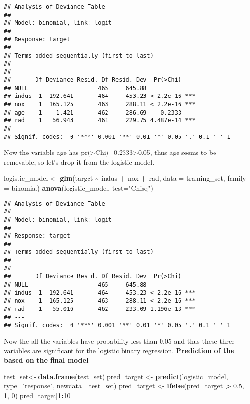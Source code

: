 \documentclass[
]{article}
\newenvironment{Shaded}{\begin{snugshade}}{\end{snugshade}}
\newcommand{\AttributeTok}[1]{\textcolor[rgb]{0.13,0.29,0.53}{#1}}
\newcommand{\DecValTok}[1]{\textcolor[rgb]{0.00,0.00,0.81}{#1}}
\newcommand{\FloatTok}[1]{\textcolor[rgb]{0.00,0.00,0.81}{#1}}
\newcommand{\FunctionTok}[1]{\textcolor[rgb]{0.13,0.29,0.53}{\textbf{#1}}}
\newcommand{\NormalTok}[1]{#1}
\newcommand{\OtherTok}[1]{\textcolor[rgb]{0.56,0.35,0.01}{#1}}
\newcommand{\SpecialCharTok}[1]{\textcolor[rgb]{0.81,0.36,0.00}{\textbf{#1}}}
\newcommand{\StringTok}[1]{\textcolor[rgb]{0.31,0.60,0.02}{#1}}
\begin{document}
\begin{verbatim}
## Analysis of Deviance Table
## 
## Model: binomial, link: logit
## 
## Response: target
## 
## Terms added sequentially (first to last)
## 
## 
##       Df Deviance Resid. Df Resid. Dev  Pr(>Chi)    
## NULL                    465     645.88              
## indus  1  192.641       464     453.23 < 2.2e-16 ***
## nox    1  165.125       463     288.11 < 2.2e-16 ***
## age    1    1.421       462     286.69    0.2333    
## rad    1   56.943       461     229.75 4.487e-14 ***
## ---
## Signif. codes:  0 '***' 0.001 '**' 0.01 '*' 0.05 '.' 0.1 ' ' 1
\end{verbatim}

Now the variable age has pr(\textgreater Chi)=0.2333\textgreater0.05,
thus age seems to be removable, so let's drop it from the logistic
model.

\begin{Shaded}
\begin{Highlighting}[]
\NormalTok{logistic\_model }\OtherTok{\textless{}{-}}  \FunctionTok{glm}\NormalTok{(target }\SpecialCharTok{\textasciitilde{}}\NormalTok{ indus }\SpecialCharTok{+}\NormalTok{ nox }\SpecialCharTok{+}\NormalTok{ rad, }\AttributeTok{data =}\NormalTok{ training\_set, }\AttributeTok{family =}\NormalTok{ binomial)}
\FunctionTok{anova}\NormalTok{(logistic\_model, }\AttributeTok{test=}\StringTok{"Chisq"}\NormalTok{)}
\end{Highlighting}
\end{Shaded}

\begin{verbatim}
## Analysis of Deviance Table
## 
## Model: binomial, link: logit
## 
## Response: target
## 
## Terms added sequentially (first to last)
## 
## 
##       Df Deviance Resid. Df Resid. Dev  Pr(>Chi)    
## NULL                    465     645.88              
## indus  1  192.641       464     453.23 < 2.2e-16 ***
## nox    1  165.125       463     288.11 < 2.2e-16 ***
## rad    1   55.016       462     233.09 1.196e-13 ***
## ---
## Signif. codes:  0 '***' 0.001 '**' 0.01 '*' 0.05 '.' 0.1 ' ' 1
\end{verbatim}

Now the all the variables have probability less than 0.05 and thus these
three variables are significant for the logistic binary regression.
\textbf{Prediction of the based on the final model}

\begin{Shaded}
\begin{Highlighting}[]
\NormalTok{test\_set}\OtherTok{\textless{}{-}} \FunctionTok{data.frame}\NormalTok{(test\_set)}
\NormalTok{pred\_target }\OtherTok{\textless{}{-}} \FunctionTok{predict}\NormalTok{(logistic\_model, }\AttributeTok{type=}\StringTok{"response"}\NormalTok{, }\AttributeTok{newdata =}\NormalTok{test\_set)}
\NormalTok{pred\_target }\OtherTok{\textless{}{-}} \FunctionTok{ifelse}\NormalTok{(pred\_target }\SpecialCharTok{\textgreater{}} \FloatTok{0.5}\NormalTok{, }\DecValTok{1}\NormalTok{, }\DecValTok{0}\NormalTok{)}
\NormalTok{pred\_target[}\DecValTok{1}\SpecialCharTok{:}\DecValTok{10}\NormalTok{]}
\end{Highlighting}
\end{Shaded}
\end{document}
